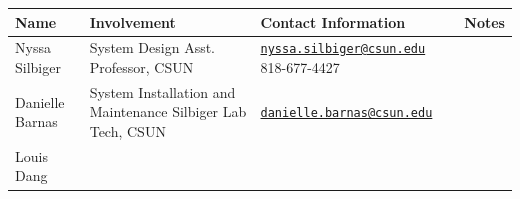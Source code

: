 \documentclass[]{book}
\begin{document}
\begin{longtable}[]{@{}llll@{}}
\toprule
\begin{minipage}[b]{0.18\columnwidth}\raggedright\strut
Name\strut
\end{minipage} & \begin{minipage}[b]{0.25\columnwidth}\raggedright\strut
Involvement\strut
\end{minipage} & \begin{minipage}[b]{0.28\columnwidth}\raggedright\strut
Contact Information\strut
\end{minipage} & \begin{minipage}[b]{0.18\columnwidth}\raggedright\strut
Notes\strut
\end{minipage}\tabularnewline
\midrule
\endhead
\begin{minipage}[t]{0.18\columnwidth}\raggedright\strut
Nyssa Silbiger\strut
\end{minipage} & \begin{minipage}[t]{0.25\columnwidth}\raggedright\strut
System Design Asst. Professor, CSUN\strut
\end{minipage} & \begin{minipage}[t]{0.28\columnwidth}\raggedright\strut
\href{mailto:nyssa.silbiger@csun.edu}{\nolinkurl{nyssa.silbiger@csun.edu}}
818-677-4427\strut
\end{minipage} & \begin{minipage}[t]{0.18\columnwidth}\raggedright\strut
\strut
\end{minipage}\tabularnewline
\begin{minipage}[t]{0.18\columnwidth}\raggedright\strut
Danielle Barnas\strut
\end{minipage} & \begin{minipage}[t]{0.25\columnwidth}\raggedright\strut
System Installation and Maintenance Silbiger Lab Tech, CSUN\strut
\end{minipage} & \begin{minipage}[t]{0.28\columnwidth}\raggedright\strut
\href{mailto:danielle.barnas@csun.edu}{\nolinkurl{danielle.barnas@csun.edu}}\strut
\end{minipage} & \begin{minipage}[t]{0.18\columnwidth}\raggedright\strut
\strut
\end{minipage}\tabularnewline
\begin{minipage}[t]{0.18\columnwidth}\raggedright\strut
Louis Dang\strut
\end{minipage} & \begin{minipage}[t]{0.25\columnwidth}\raggedright\strut

\end{minipage}
\end{longtable}
\end{document}
